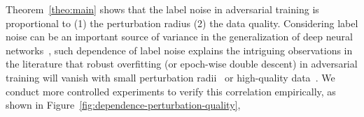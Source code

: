    Theorem~\ref{theo:main} shows that
    the label noise in adversarial training is proportional to (1) the perturbation radius (2) the data quality. 
    Considering label noise can be an important source of variance in the generalization of deep neural networks~\citep{Nakkiran2020DeepDD, Yang2020RethinkingBT}, such dependence of label noise explains the intriguing observations in the literature that robust overfitting (or epoch-wise double descent) in adversarial training will vanish with small perturbation radii~\citep{Dong2021ExploringMI} or high-quality data~\citep{Dong2021DataPF}. 
    We conduct more controlled experiments to verify this correlation empirically, as shown in Figure~\ref{fig:dependence-perturbation-quality}, 
    
